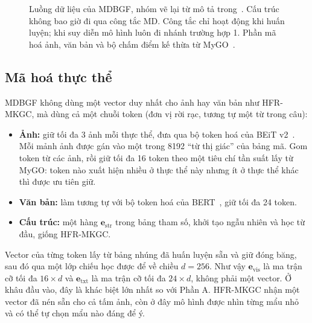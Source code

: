 \documentclass[conference,a4paper]{IEEEtran}
\begin{document}
\begin{figure}[t]
\caption{Luồng dữ liệu của MDBGF, nhóm vẽ lại từ mô tả trong~\cite{mdbgf}. Cấu trúc không bao giờ đi qua công tắc MD. Công tắc chỉ hoạt động khi huấn luyện; khi suy diễn mô hình luôn đi nhánh trường hợp 1. Phần mã hoá ảnh, văn bản và bộ chấm điểm kế thừa từ MyGO~\cite{mygo}.}
\label{fig:mdbgf-pipeline}
\end{figure}

\subsection{Mã hoá thực thể}
\label{sec:mdbgf-encode}

MDBGF không dùng một vector duy nhất cho ảnh hay văn bản như HFR-MKGC, mà dùng cả một chuỗi token (đơn vị rời rạc, tương tự một từ trong câu):

\begin{itemize}
\item \textbf{Ảnh:} giữ tối đa 3 ảnh mỗi thực thể, đưa qua bộ token hoá của BEiT v2~\cite{beitv2}. Mỗi mảnh ảnh được gán vào một trong 8192 ``từ thị giác'' của bảng mã. Gom token từ các ảnh, rồi giữ tối đa 16 token theo một tiêu chí tần suất lấy từ MyGO: token nào xuất hiện nhiều ở thực thể này nhưng ít ở thực thể khác thì được ưu tiên giữ.
\item \textbf{Văn bản:} làm tương tự với bộ token hoá của BERT~\cite{bert}, giữ tối đa 24 token.
\item \textbf{Cấu trúc:} một hàng $\mathbf{e}_{\mathrm{str}}$ trong bảng tham số, khởi tạo ngẫu nhiên và học từ đầu, giống HFR-MKGC.
\end{itemize}

Vector của từng token lấy từ bảng nhúng đã huấn luyện sẵn và giữ đóng băng, sau đó qua một lớp chiếu học được để về chiều $d = 256$. Như vậy $\mathbf{e}_{\mathrm{vis}}$ là ma trận cỡ tối đa $16 \times d$ và $\mathbf{e}_{\mathrm{txt}}$ là ma trận cỡ tối đa $24 \times d$, không phải một vector. Ở khâu đầu vào, đây là khác biệt lớn nhất so với Phần A. HFR-MKGC nhận một vector đã nén sẵn cho cả tấm ảnh, còn ở đây mô hình được nhìn từng mẩu nhỏ và có thể tự chọn mẩu nào đáng để ý.
\end{document}
